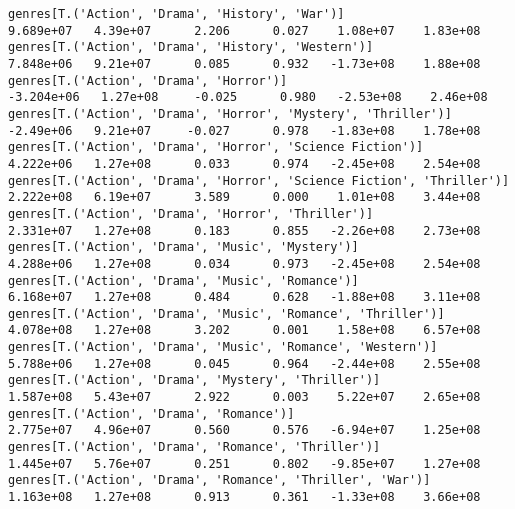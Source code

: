 \documentclass[11pt]{article}
\begin{document}
\begin{Verbatim}[commandchars=\\\{\}]
genres[T.('Action', 'Drama', 'History', 'War')]                                                               9.689e+07   4.39e+07      2.206      0.027    1.08e+07    1.83e+08
genres[T.('Action', 'Drama', 'History', 'Western')]                                                           7.848e+06   9.21e+07      0.085      0.932   -1.73e+08    1.88e+08
genres[T.('Action', 'Drama', 'Horror')]                                                                      -3.204e+06   1.27e+08     -0.025      0.980   -2.53e+08    2.46e+08
genres[T.('Action', 'Drama', 'Horror', 'Mystery', 'Thriller')]                                                -2.49e+06   9.21e+07     -0.027      0.978   -1.83e+08    1.78e+08
genres[T.('Action', 'Drama', 'Horror', 'Science Fiction')]                                                    4.222e+06   1.27e+08      0.033      0.974   -2.45e+08    2.54e+08
genres[T.('Action', 'Drama', 'Horror', 'Science Fiction', 'Thriller')]                                        2.222e+08   6.19e+07      3.589      0.000    1.01e+08    3.44e+08
genres[T.('Action', 'Drama', 'Horror', 'Thriller')]                                                           2.331e+07   1.27e+08      0.183      0.855   -2.26e+08    2.73e+08
genres[T.('Action', 'Drama', 'Music', 'Mystery')]                                                             4.288e+06   1.27e+08      0.034      0.973   -2.45e+08    2.54e+08
genres[T.('Action', 'Drama', 'Music', 'Romance')]                                                             6.168e+07   1.27e+08      0.484      0.628   -1.88e+08    3.11e+08
genres[T.('Action', 'Drama', 'Music', 'Romance', 'Thriller')]                                                 4.078e+08   1.27e+08      3.202      0.001    1.58e+08    6.57e+08
genres[T.('Action', 'Drama', 'Music', 'Romance', 'Western')]                                                  5.788e+06   1.27e+08      0.045      0.964   -2.44e+08    2.55e+08
genres[T.('Action', 'Drama', 'Mystery', 'Thriller')]                                                          1.587e+08   5.43e+07      2.922      0.003    5.22e+07    2.65e+08
genres[T.('Action', 'Drama', 'Romance')]                                                                      2.775e+07   4.96e+07      0.560      0.576   -6.94e+07    1.25e+08
genres[T.('Action', 'Drama', 'Romance', 'Thriller')]                                                          1.445e+07   5.76e+07      0.251      0.802   -9.85e+07    1.27e+08
genres[T.('Action', 'Drama', 'Romance', 'Thriller', 'War')]                                                   1.163e+08   1.27e+08      0.913      0.361   -1.33e+08    3.66e+08

\end{Verbatim}
\end{document}
